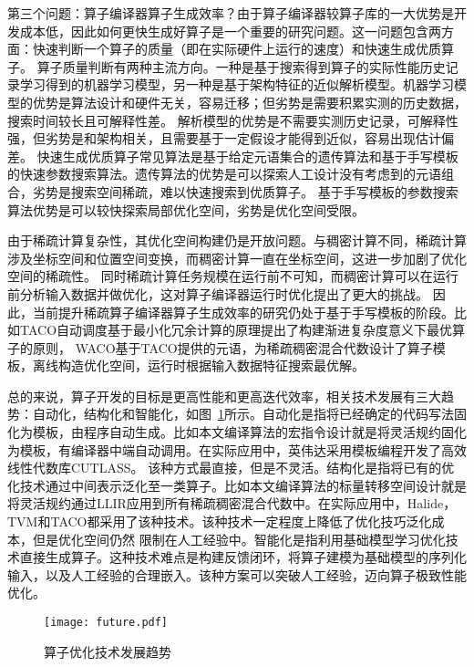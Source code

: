 第三个问题：算子编译器算子生成效率？由于算子编译器较算子库的一大优势是开发成本低，因此如何更快生成好算子是一个重要的研究问题。这一问题包含两方面：快速判断一个算子的质量（即在实际硬件上运行的速度）和快速生成优质算子。
算子质量判断有两种主流方向。一种是基于搜索得到算子的实际性能历史记录学习得到的机器学习模型，另一种是基于架构特征的近似解析模型。机器学习模型的优势是算法设计和硬件无关，容易迁移；但劣势是需要积累实测的历史数据，搜索时间较长且可解释性差\cite{AutoTVM,Ansor,AMOS}。
解析模型的优势是不需要实测历史记录，可解释性强，但劣势是和架构相关，且需要基于一定假设才能得到近似，容易出现估计偏差\cite{GNNAdvisor,Roller,ALCOP}。
快速生成优质算子常见算法是基于给定元语集合的遗传算法和基于手写模板的快速参数搜索算法。遗传算法的优势是可以探索人工设计没有考虑到的元语组合，劣势是搜索空间稀疏，难以快速搜索到优质算子\cite{Hidet}。
基于手写模板的参数搜索算法优势是可以较快探索局部优化空间，劣势是优化空间受限\cite{Auto-Halide}。

由于稀疏计算复杂性，其优化空间构建仍是开放问题。与稠密计算不同，稀疏计算涉及坐标空间和位置空间变换，而稠密计算一直在坐标空间，这进一步加剧了优化空间的稀疏性\cite{senanayake:2020:scheduling}。
同时稀疏计算任务规模在运行前不可知，而稠密计算可以在运行前分析输入数据并做优化，这对算子编译器运行时优化提出了更大的挑战\cite{Dynamic-tiling}。
因此，当前提升稀疏算子编译器算子生成效率的研究仍处于基于手写模板的阶段。比如TACO自动调度\cite{ahrens:2022:autoscheduling}基于最小化冗余计算的原理提出了构建渐进复杂度意义下最优算子的原则，
WACO\cite{WACO}基于TACO\cite{kjolstad:2017:taco}提供的元语，为稀疏稠密混合代数设计了算子模板，离线构造优化空间，运行时根据输入数据特征搜索最优解。

总的来说，算子开发的目标是更高性能和更高迭代效率，相关技术发展有三大趋势：自动化，结构化和智能化，如图~\ref{fig:future}所示。自动化是指将已经确定的代码写法固化为模板，由程序自动生成。比如本文编译算法的宏指令设计就是将灵活规约固化为模板，有编译器中端自动调用。在实际应用中，英伟达采用模板编程开发了高效线性代数库CUTLASS\cite{CUTLASS}。
该种方式最直接，但是不灵活。结构化是指将已有的优化技术通过中间表示泛化至一类算子。比如本文编译算法的标量转移空间设计就是将灵活规约通过LLIR应用到所有稀疏稠密混合代数中。在实际应用中，Halide\cite{halide}，TVM\cite{tvm}和TACO\cite{kjolstad:2017:taco}都采用了该种技术。该种技术一定程度上降低了优化技巧泛化成本，但是优化空间仍然
限制在人工经验中。智能化是指利用基础模型\cite{Bommasani2021FoundationModels}学习优化技术直接生成算子。这种技术难点是构建反馈闭环，将算子建模为基础模型的序列化输入，以及人工经验的合理嵌入。该种方案可以突破人工经验，迈向算子极致性能优化。
\begin{figure}
  \centering
  \texttt{[image: future.pdf]}
  \caption{算子优化技术发展趋势}
  \label{fig:future}
\end{figure}